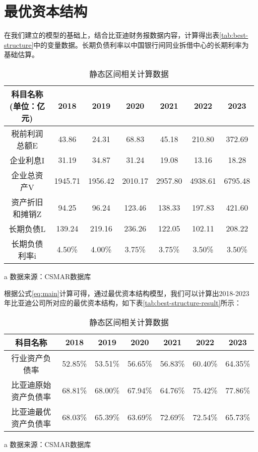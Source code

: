 \section{最优资本结构}
在我们建立的模型的基础上，结合比亚迪财务报数据内容，计算得出表\eqref{tab:best-structure}中的变量数据。长期负债利率以中国银行间同业拆借中心的长期利率为基础估算。 
\begin{table}
  \centering
  \begin{threeparttable}[c]
    \caption{静态区间相关计算数据}
    \label{tab:best-structure}
    \begin{tabular}{ccccccc}
      \toprule
        科目名称(单位：亿元) & 2018 & 2019 & 2020 & 2021 & 2022 & 2023 \\ 
      \midrule
        税前利润总额E & 43.86  & 24.31  & 68.83  & 45.18  & 210.80  & 372.69  \\ 
        企业利息I & 31.19  & 34.87  & 31.24  & 19.08  & 13.16  & 18.28  \\ 
        企业总资产V & 1945.71  & 1956.42  & 2010.17  & 2957.80  & 4938.61  & 6795.48  \\ 
        资产折旧和摊销Z & 94.25  & 96.24  & 123.46  & 138.33  & 197.83  & 421.60  \\ 
        长期负债L & 139.24  & 219.16  & 236.26  & 122.05  & 102.11  & 208.22  \\ 
        长期负债利率i & 4.50\% & 4.00\% & 3.75\% & 3.75\% & 3.50\% & 3.50\% \\ 
      \bottomrule
    \end{tabular}
    \begin{tablenotes}
      \item [a] 数据来源：CSMAR数据库
    \end{tablenotes}
  \end{threeparttable}
\end{table}
根据公式\eqref{eq:main}计算可得，通过最优资本结构模型，我们可以计算出2018-2023年比亚迪公司所对应的最优资本结构，如下表\eqref{tab:best-structure-result}所示：
\begin{table}
  \centering
  \begin{threeparttable}[c]
    \caption{静态区间相关计算数据}
    \label{tab:best-structure-result}
    \begin{tabular}{ccccccc}
      \toprule
        科目名称 & 2018 & 2019 & 2020 & 2021 & 2022 & 2023 \\ 
      \midrule
        行业资产负债率 & 52.85\% & 53.51\% & 56.65\% & 56.83\% & 60.40\% & 64.35\% \\ 
        比亚迪原始资产负债率 & 68.81\% & 68.00\% & 67.94\% & 64.76\% & 75.42\% & 77.86\% \\ 
        比亚迪最优资产负债率 & 68.03\% & 65.39\% & 63.69\% & 72.69\% & 72.54\% & 65.73\% \\ 
      \bottomrule
    \end{tabular}
    \begin{tablenotes}
      \item [a] 数据来源：CSMAR数据库
    \end{tablenotes}
  \end{threeparttable}
\end{table}

